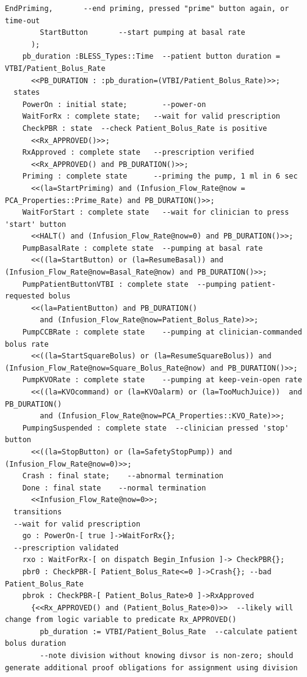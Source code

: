 \begin{lstlisting}[language=aadl, frame=single, gobble=0, caption={\lstinline{Rate_Controller} thread from \lstinline{PCA_Operation} component with BLESS assertions}]
        EndPriming,       --end priming, pressed "prime" button again, or time-out 
        StartButton       --start pumping at basal rate
      );    
    pb_duration :BLESS_Types::Time  --patient button duration = VTBI/Patient_Bolus_Rate
      <<PB_DURATION : :pb_duration=(VTBI/Patient_Bolus_Rate)>>;
  states
    PowerOn : initial state;        --power-on
    WaitForRx : complete state;   --wait for valid prescription
    CheckPBR : state  --check Patient_Bolus_Rate is positive
      <<Rx_APPROVED()>>;
    RxApproved : complete state   --prescription verified
      <<Rx_APPROVED() and PB_DURATION()>>;
    Priming : complete state      --priming the pump, 1 ml in 6 sec
      <<(la=StartPriming) and (Infusion_Flow_Rate@now = PCA_Properties::Prime_Rate) and PB_DURATION()>>;
    WaitForStart : complete state   --wait for clinician to press 'start' button
      <<HALT() and (Infusion_Flow_Rate@now=0) and PB_DURATION()>>;
    PumpBasalRate : complete state  --pumping at basal rate
      <<((la=StartButton) or (la=ResumeBasal)) and (Infusion_Flow_Rate@now=Basal_Rate@now) and PB_DURATION()>>;
    PumpPatientButtonVTBI : complete state  --pumping patient-requested bolus
      <<(la=PatientButton) and PB_DURATION()
        and (Infusion_Flow_Rate@now=Patient_Bolus_Rate)>>;
    PumpCCBRate : complete state    --pumping at clinician-commanded bolus rate
      <<((la=StartSquareBolus) or (la=ResumeSquareBolus)) and (Infusion_Flow_Rate@now=Square_Bolus_Rate@now) and PB_DURATION()>>;
    PumpKVORate : complete state    --pumping at keep-vein-open rate
      <<((la=KVOcommand) or (la=KVOalarm) or (la=TooMuchJuice))  and PB_DURATION()
        and (Infusion_Flow_Rate@now=PCA_Properties::KVO_Rate)>>;
    PumpingSuspended : complete state  --clinician pressed 'stop' button
      <<((la=StopButton) or (la=SafetyStopPump)) and (Infusion_Flow_Rate@now=0)>>;
    Crash : final state;    --abnormal termination
    Done : final state    --normal termination
      <<Infusion_Flow_Rate@now=0>>;
  transitions
  --wait for valid prescription
    go : PowerOn-[ true ]->WaitForRx{};  
  --prescription validated
    rxo : WaitForRx-[ on dispatch Begin_Infusion ]-> CheckPBR{};
    pbr0 : CheckPBR-[ Patient_Bolus_Rate<=0 ]->Crash{}; --bad Patient_Bolus_Rate
    pbrok : CheckPBR-[ Patient_Bolus_Rate>0 ]->RxApproved
      {<<Rx_APPROVED() and (Patient_Bolus_Rate>0)>>  --likely will change from logic variable to predicate Rx_APPROVED()
        pb_duration := VTBI/Patient_Bolus_Rate  --calculate patient bolus duration
        --note division without knowing divsor is non-zero; should generate additional proof obligations for assignment using division

\end{lstlisting}
